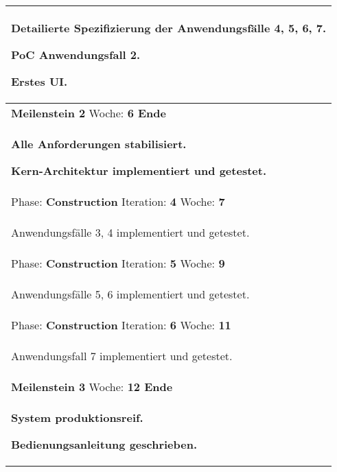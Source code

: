\documentclass[11pt,ngerman]{article}
\begin{document}
\begin{table}[H]
\begin{tabularx}{\textwidth}{X}
\begin{compactitem}
                \item Detailierte Spezifizierung der Anwendungsfälle 4, 5, 6, 7.
                \item PoC Anwendungsfall 2.
                \item Erstes UI.
            \end{compactitem}\\
            \toprule
            \rowcolor{lightgray}
            \textbf{Meilenstein 2} Woche: \textbf{6 Ende}\\
            \rowcolor{lightgray}
            \begin{compactitem}
                \item \textbf{Alle Anforderungen stabilisiert.}
                \item \textbf{Kern-Architektur implementiert und getestet.}
            \end{compactitem}\\
            \toprule
            Phase: \textbf{Construction} Iteration: \textbf{4} Woche: \textbf{7}\\
            \begin{compactitem}
                \item Anwendungsfälle 3, 4 implementiert und getestet.
            \end{compactitem}\\
            \toprule
            Phase: \textbf{Construction} Iteration: \textbf{5} Woche: \textbf{9}\\
            \begin{compactitem}
                \item Anwendungsfälle 5, 6 implementiert und getestet.
            \end{compactitem}\\
            \toprule
            Phase: \textbf{Construction} Iteration: \textbf{6} Woche: \textbf{11}\\
            \begin{compactitem}
                \item Anwendungsfall 7 implementiert und getestet.
            \end{compactitem}\\
            \toprule
            \rowcolor{lightgray}
            \textbf{Meilenstein 3} Woche: \textbf{12 Ende}\\
            \rowcolor{lightgray}
            \begin{compactitem}
                \item \textbf{System produktionsreif.}
                \item \textbf{Bedienungsanleitung geschrieben.}
            \end{compactitem}\\
            \bottomrule
        \end{tabularx}
        \label{tab:Gesamtprojektplan}
    \end{table}
\end{document}
